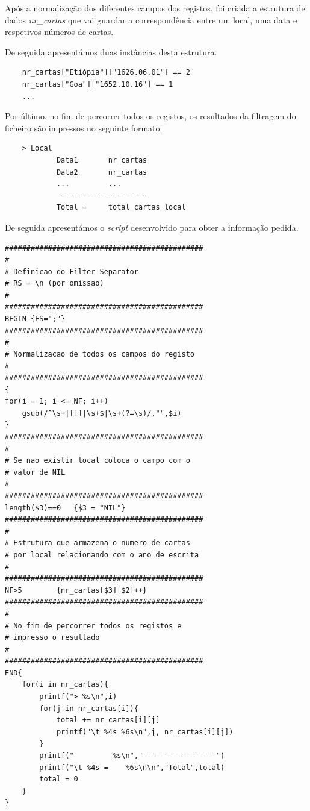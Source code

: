 \documentclass[11pt,a4paper]{report}
\begin{document}
\quad Após a normalização dos diferentes campos dos registos, foi criada a estrutura de dados \textit{nr\_cartas} que vai guardar a correspondência entre um local, uma data e respetivos números de cartas. 

\quad De seguida apresentámos duas instâncias desta estrutura.
\small{
\begin{verbatim}
    nr_cartas["Etiópia"]["1626.06.01"] == 2
    nr_cartas["Goa"]["1652.10.16"] == 1
    ...
\end{verbatim}

\quad Por último, no fim de percorrer todos os registos, os resultados da filtragem do ficheiro são impressos no seguinte formato:

\begin{verbatim}
    > Local
            Data1       nr_cartas
            Data2       nr_cartas
            ...         ...
            ---------------------
            Total =     total_cartas_local
\end{verbatim}

De seguida apresentámos o \textit{script} desenvolvido para obter a informação pedida.

\newpage

\begin{verbatim}
##############################################
#
# Definicao do Filter Separator
# RS = \n (por omissao)
#
##############################################
BEGIN {FS=";"}
##############################################
#
# Normalizacao de todos os campos do registo
#
##############################################
{ 
for(i = 1; i <= NF; i++) 
    gsub(/^\s+|[]]|\s+$|\s+(?=\s)/,"",$i)
}
##############################################
#
# Se nao existir local coloca o campo com o
# valor de NIL
#
##############################################
length($3)==0	{$3 = "NIL"}
##############################################
#
# Estrutura que armazena o numero de cartas 
# por local relacionando com o ano de escrita
#
##############################################
NF>5		{nr_cartas[$3][$2]++}
##############################################
#
# No fim de percorrer todos os registos e
# impresso o resultado
#
##############################################
END{
    for(i in nr_cartas){
        printf("> %s\n",i)
        for(j in nr_cartas[i]){
            total += nr_cartas[i][j]
            printf("\t %4s %6s\n",j, nr_cartas[i][j])
        }
	    printf("         %s\n","-----------------")
	    printf("\t %4s =    %6s\n\n","Total",total)
	    total = 0
    }
}
\end{verbatim}}
\end{document}
